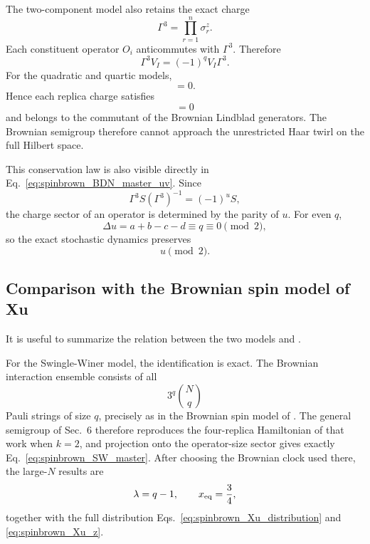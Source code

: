 \documentclass{article}
\theoremstyle{definition}
\begin{document}
The two-component model also retains the exact charge
\begin{equation}
    \Gamma^3
    =
    \prod_{r=1}^n\sigma_r^z.
\end{equation}
Each constituent operator $O_i$ anticommutes with $\Gamma^3$.  Therefore
\begin{equation}
    \Gamma^3V_I
    =
    (-1)^qV_I\Gamma^3.
\end{equation}
For the quadratic and quartic models,
\begin{equation}
    [\Gamma^3,V_I]=0.
    \label{eq:spinbrown_BDN_charge_commute}
\end{equation}
Hence each replica charge satisfies
\begin{equation}
    [\Gamma^{3(a)},W_I^{(k)}]=0
\end{equation}
and belongs to the commutant of the Brownian Lindblad generators.  The
Brownian semigroup therefore cannot approach the unrestricted Haar twirl
on the full Hilbert space.

This conservation law is also visible directly in
Eq.~\eqref{eq:spinbrown_BDN_master_uv}.  Since
\begin{equation}
    \Gamma^3 S(\Gamma^3)^{-1}
    =
    (-1)^u S,
\end{equation}
the charge sector of an operator is determined by the parity of $u$.  For
even $q$,
\begin{equation}
    \Delta u
    =
    a+b-c-d
    \equiv q
    \equiv0
    \pmod 2,
\end{equation}
so the exact stochastic dynamics preserves
\begin{equation}
    u\pmod2.
\end{equation}


\subsection{Comparison with the Brownian spin model of Xu}

It is useful to summarize the relation between the two models and
\cite{Xu2024}.

For the Swingle-Winer model, the identification is exact.  The Brownian
interaction ensemble consists of all
\begin{equation}
    3^q\binom Nq
\end{equation}
Pauli strings of size $q$, precisely as in the Brownian spin model of
\cite{Xu2024}.  The general semigroup of Sec.~6 therefore reproduces the
four-replica Hamiltonian of that work when $k=2$, and projection onto the
operator-size sector gives exactly
Eq.~\eqref{eq:spinbrown_SW_master}.  After choosing the Brownian clock used
there, the large-$N$ results are
\begin{equation}
    \lambda=q-1,
    \qquad
    x_{\rm eq}=\frac34,
\end{equation}
together with the full distribution
Eqs.~\eqref{eq:spinbrown_Xu_distribution} and
\eqref{eq:spinbrown_Xu_z}.
\end{document}
